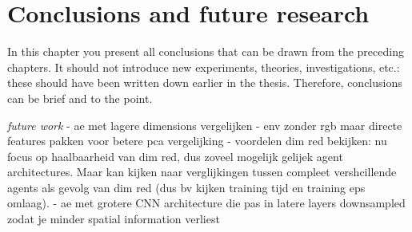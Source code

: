 \chapter{Conclusions and future research}\label{conclusions}
In this chapter you present all conclusions that can be drawn from the
preceding chapters.
It should not introduce new experiments, theories, investigations, etc.:
these should have been written down earlier in the thesis.
Therefore, conclusions can be brief and to the point.

\emph{future work}
- ae met lagere dimensions vergelijken
- env zonder rgb maar directe features pakken voor betere pca vergelijking
- voordelen dim red bekijken: nu focus op haalbaarheid van dim red, dus zoveel mogelijk gelijek agent architectures. Maar kan kijken naar verglijkingen tussen compleet vershcillende agents als gevolg van dim red (dus bv kijken training tijd en training eps omlaag).
- ae met grotere CNN architecture die pas in latere layers downsampled zodat je minder spatial information verliest